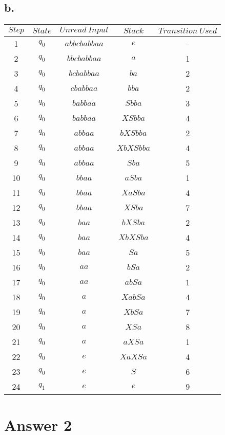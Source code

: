 \documentclass[12pt]{article}
\begin{document}
\subsection*{b.}
\begin{table}[H]
	\small
	\centering
	\begin{tabular}{|c|c|c|c|c|}	
	\hline
	$Step$ & $State$ & $Unread \ Input$ & $Stack$ & $Transition \ Used$\\
	\hline 
	1 & $q_0$ & $abbcbabbaa$ & $e$ & -\\			
	2 & $q_0$ & $bbcbabbaa$ & $a$ & 1\\	
	3 & $q_0$ & $bcbabbaa$  & $ba$ & 2\\
	4 & $q_0$ & $cbabbaa$   & $bba$ & 2\\
	5 & $q_0$ & $babbaa$   & $Sbba$ & 3\\	
	6 & $q_0$ & $babbaa$ & $XSbba$ & 4\\			
	7 & $q_0$ & $abbaa$ & $bXSbba$ & 2\\	
	8 & $q_0$ & $abbaa$  & $XbXSbba$ & 4\\
	9 & $q_0$ & $abbaa$   & $Sba$ & 5\\
	10 & $q_0$ & $bbaa$ & $aSba$ & 1\\			
	11 & $q_0$ & $bbaa$ & $XaSba$ & 4\\	
	12 & $q_0$ & $bbaa$  & $XSba$ & 7\\
	13 & $q_0$ & $baa$   & $bXSba$ & 2\\
	14 & $q_0$ & $baa$   & $XbXSba$ & 4\\	
	15 & $q_0$ & $baa$ & $Sa$ & 5\\			
	16 & $q_0$ & $aa$ & $bSa$ & 2\\	
	17 & $q_0$ & $aa$  & $abSa$ & 1\\
	18 & $q_0$ & $a$   & $XabSa$ & 4\\
	19 & $q_0$ & $a$ & $XbSa$ & 7\\			
	20 & $q_0$ & $a$ & $XSa$ & 8\\	
	21 & $q_0$ & $a$  & $aXSa$ & 1\\
	22 & $q_0$ & $e$   & $XaXSa$ & 4\\
	23 & $q_0$ & $e$   & $S$ & 6\\	
	24 & $q_1$ & $e$ & $e$ & 9\\			
	\hline 
	\end{tabular}
	\end{table}

\newpage
\section*{Answer 2}
\end{document}
